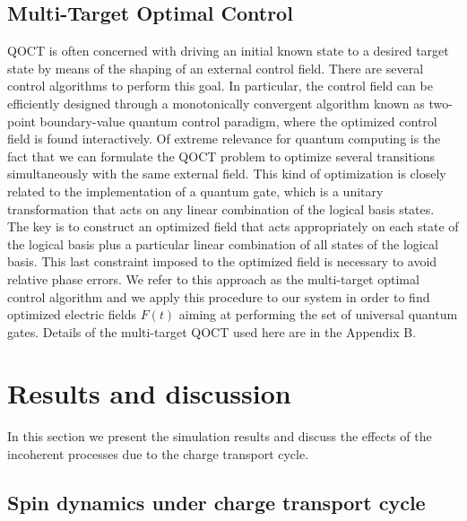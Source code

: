 \documentclass[prb,twocolumn,showpacs,floats]{revtex4}
\begin{document}
\subsection{Multi-Target Optimal Control}

QOCT is often concerned with driving an initial known state to a desired target state by means of the shaping of an external control field.\cite{qoct} There are several control algorithms to perform this goal. In particular, the control field can be efficiently designed through a monotonically convergent algorithm known as two-point boundary-value quantum control paradigm, where the optimized control field is found interactively.\cite{tbqcp} Of extreme relevance for quantum computing is the fact that we can formulate the QOCT problem to optimize several transitions simultaneously with the same external field. This kind of optimization is closely related to the implementation of a quantum gate, which is a unitary transformation that acts on any linear combination of the logical basis states.
 The key is to construct an optimized field that acts appropriately on each 
 state of the logical basis plus a particular linear combination of all states of the logical basis. This last constraint imposed to the optimized field is necessary to avoid relative phase errors.\cite{multitarget,Kosloff}
 We refer to this approach as the multi-target optimal control algorithm 
 and we apply this procedure to our system in order to find optimized electric fields $F(t)$ 
 aiming at performing the set of universal quantum gates.   Details of the multi-target QOCT used here are in the Appendix B.



\section{Results and discussion}

In this section we present the simulation results and discuss
the effects of the incoherent processes due to the charge transport cycle.

\subsection{Spin dynamics under charge transport cycle}
\end{document}
